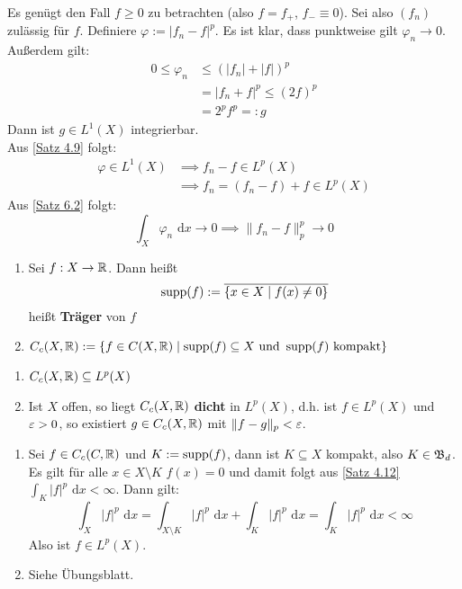 \documentclass[a4paper,twoside,DIV15,BCOR12mm,chapterprefix=true,headings=onelinechapter]{scrbook}
\begin{document}
\begin{beweis}
Es genügt den Fall $f\ge 0$ zu betrachten (also $f=f_+$, $f_-\equiv 0$). Sei also $(f_n)$ zulässig für $f$. Definiere $\varphi:=|f_n-f|^p$. Es ist klar, dass punktweise gilt $\varphi_n\to 0$. Außerdem gilt:
\begin{align*}
0\le\varphi_n&\le (|f_n|+|f|)^p\\
&=|f_n+f|^p\le (2f)^p\\
&=2^pf^p=:g 
\end{align*}
Dann ist $g\in L^1(X)$ integrierbar.\\
Aus \ref{Satz 4.9} folgt:
\begin{align*}
\varphi\in L^1(X)&\implies f_n-f\in L^p(X)\\
&\implies f_n=(f_n-f)+f\in L^p(X) 
\end{align*}
Aus \ref{Satz 6.2} folgt:
\[\int_X\varphi_n\text{ d}x\to 0 \implies \|f_n-f\|_p^p\to 0\]
\end{beweis}

\begin{definition}
\begin{enumerate}
\item Sei $f:X\to\mathbb{R}$. Dann heißt
\[\mathop{\rm supp}\nolimits (f):=\overline{\{x\in X\mid f(x)\ne 0\}}\]
heißt \textbf{Träger} von $f$
\item $C_c(X,\mathbb{R}):=\{f\in C(X,\mathbb{R})\mid \mathop{\rm supp}\nolimits(f)\subseteq X\text{ und } \mathop{\rm supp}\nolimits(f) \text{ kompakt}\}$
\end{enumerate}
\end{definition}

\begin{satz}
\label{Satz 16.8}
\begin{enumerate}
\item $C_c(X,\mathbb{R})\subseteq L^p(X)$
\item Ist $X$ offen, so liegt $C_c(X,\mathbb{R})$ \textbf{dicht} in $L^p(X)$, d.h. ist $f\in L^p(X)$ und $\varepsilon>0$, so existiert $g\in C_c(X,\mathbb{R})$ mit $\|f-g\|_p<\varepsilon$.
\end{enumerate}
\end{satz}

\begin{beweis}
\begin{enumerate}
\item Sei $f\in C_c(C,\mathbb{R})$ und $K:=\mathop{\rm supp}\nolimits(f)$, dann ist $K\subseteq X$ kompakt, also $K\in\mathfrak{B}_d$. Es gilt für alle $x\in X\setminus K$ $f(x)=0$ und damit folgt aus \ref{Satz 4.12} $\int_K |f|^p\text{ d}x<\infty$. Dann gilt:
\[\int_X |f|^p\text{ d}x=\int_{X\setminus K} |f|^p\text{ d}x+\int_K |f|^p\text{ d}x=\int_K |f|^p\text{ d}x<\infty\]
Also ist $f\in L^p(X)$.
\item Siehe Übungsblatt.
\end{enumerate}
\end{beweis}
\end{document}
